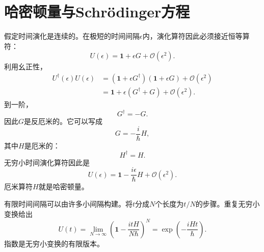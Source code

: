 \begin{classroomqa}
\end{classroomqa}

\section{哈密顿量与Schr\"odinger方程}

假定时间演化是连续的。在极短的时间间隔\(\epsilon\)内，演化算符因此必须接近恒等算符：
\begin{equation}
U(\epsilon)=\mathbf 1+\epsilon G+\mathcal O(\epsilon^2).
\end{equation}
利用幺正性，
\begin{align}
U^\dagger(\epsilon)U(\epsilon)
&=
\left(\mathbf 1+\epsilon G^\dagger\right)
\left(\mathbf 1+\epsilon G\right)
+\mathcal O(\epsilon^2)
\\
&=
\mathbf 1+\epsilon(G^\dagger+G)
+\mathcal O(\epsilon^2).
\end{align}
到一阶，
\begin{equation}
G^\dagger=-G.
\end{equation}
因此\(G\)是反厄米的。它可以写成
\begin{equation}
G=-\frac{i}{\hbar}H,
\end{equation}
其中\(H\)是厄米的：
\begin{equation}
H^\dagger=H.
\end{equation}
无穷小时间演化算符因此是
\begin{equation}
U(\epsilon)
=
\mathbf 1-\frac{i\epsilon}{\hbar}H
+\mathcal O(\epsilon^2).
\end{equation}
厄米算符\(H\)就是哈密顿量。

\begin{classroomqa}
\end{classroomqa}

有限时间间隔可以由许多小间隔构建。将\(t\)分成\(N\)个长度为\(t/N\)的步骤。重复无穷小变换给出
\begin{equation}
U(t)
=
\lim_{N\to\infty}
\left(
\mathbf 1-\frac{itH}{N\hbar}
\right)^N
=
\exp\left(-\frac{iHt}{\hbar}\right).
\end{equation}
指数是无穷小变换的有限版本。

